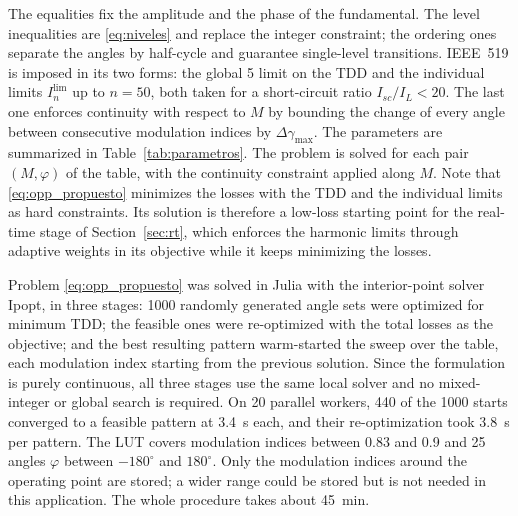 \documentclass[conference]{IEEEtran}
\newcommand{\pct}{\text{\char`\%}}
\newcommand{\old}[1]{\par\smallskip\noindent{\color{gray}\footnotesize
    \textbf{[ANTES]} #1}\par\smallskip}
\renewcommand{\old}[1]{}       %
\begin{document}
The equalities fix the amplitude and the phase of the fundamental. The level
inequalities are \eqref{eq:niveles} and replace the integer constraint; the
ordering ones separate the angles by half-cycle and guarantee single-level
transitions. IEEE~519 is imposed in its two forms: the global 5\pct{} limit on the TDD and
the individual limits $I_{n}^{\text{lim}}$ up to $n=50$, both taken for a
short-circuit ratio $I_{sc}/I_{L} < 20$. The last one enforces continuity
with respect to $M$ by bounding the change of every angle between
consecutive modulation indices by $\Delta\gamma_{\max}$. The
parameters are summarized in Table~\ref{tab:parametros}. The problem is
solved for each pair $(M,\varphi)$ of the table, with the continuity
constraint applied along $M$. Note that \eqref{eq:opp_propuesto} minimizes
the losses with the TDD and the individual limits as hard constraints. Its
solution is therefore a low-loss starting point for the real-time stage of
Section~\ref{sec:rt}, which enforces the harmonic limits through adaptive
weights in its objective while it keeps minimizing the losses.
\old{The last one enforces continuity with respect to $M$, required for
Section~\ref{sec:implementacion}. [\dots] Note that \eqref{eq:opp_propuesto}
minimizes the losses with the distortion as a constraint, whereas the
real-time stage of Section~\ref{sec:rt} minimizes the distortion with the
losses as a secondary term: the off-line solution sets the loss level, and
the online refinement preserves harmonic compliance around it.}

Problem \eqref{eq:opp_propuesto} was solved in Julia with the interior-point
solver Ipopt, in three stages: 1000 randomly generated angle sets were
optimized for minimum TDD; the feasible ones were re-optimized with the
total losses as the objective; and the best resulting pattern warm-started
the sweep over the table, each modulation index starting from the previous
solution. Since the formulation is purely continuous, all three stages use
the same local solver and no mixed-integer or global search is required. On
20 parallel workers, 440 of the 1000 starts converged to a feasible pattern
at 3.4~s each, and their re-optimization took 3.8~s per pattern. The LUT
covers modulation indices between 0.83 and 0.9 and 25 angles $\varphi$
between $-180^\circ$ and $180^\circ$. Only the modulation indices around
the operating point are stored; a wider range could be stored but is not
needed in this application. The whole procedure takes about 45~min.
\end{document}
